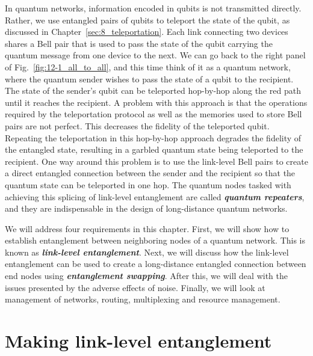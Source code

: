 In quantum networks, information encoded in qubits is not transmitted directly.
Rather, we use entangled pairs of qubits to teleport the state of the qubit, as discussed in Chapter~\ref{sec:8_teleportation}.
Each link connecting two devices shares a Bell pair that is used to pass the state of the qubit carrying the quantum message from one device to the next.
We can go back to the right panel of Fig.~\ref{fig:12-1_all_to_all}, and this time think of it as a quantum network, where the quantum sender wishes to pass the state of a qubit to the recipient.
The state of the sender's qubit can be teleported hop-by-hop along the red path until it reaches the recipient.
A problem with this approach is that the operations required by the teleportation protocol as well as the memories used to store Bell pairs are not perfect.
This decreases the fidelity of the teleported qubit.
Repeating the teleportation in this hop-by-hop approach degrades the fidelity of the entangled state, resulting in a garbled quantum state being teleported to the recipient.
One way around this problem is to use the link-level Bell pairs to create a direct entangled connection between the sender and the recipient so that the quantum state can be teleported in one hop.
The quantum nodes tasked with achieving this splicing of link-level entanglement are called \emph{\textbf{quantum repeaters}}, and they are indispensable in the design of long-distance quantum networks.

We will address four requirements in this chapter.
First, we will show how to establish entanglement between neighboring nodes of a quantum network.
This is known as \textbf{\emph{link-level entanglement}}.
Next, we will discuss how the link-level entanglement can be used to create a long-distance entangled connection between end nodes using \textbf{\emph{entanglement swapping}}.
After this, we will deal with the issues presented by the adverse effects of noise.
Finally, we will look at management of networks, routing, multiplexing and resource management.


\section{Making link-level entanglement}
\label{sec:12-2_making_link_level_rantanglement}

